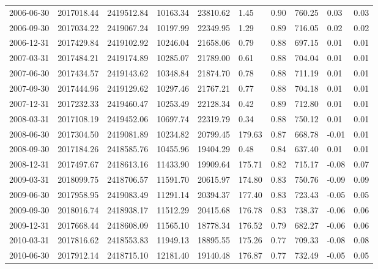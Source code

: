 \begin{landscape}
\begin{longtable}{llllllllll}
2006-06-30 & 2017018.44 & 2419512.84 & 10163.34 & 23810.62 & 1.45   & 0.90         & 760.25   & 0.03     & 0.03     \\
2006-09-30 & 2017034.22 & 2419067.24 & 10197.99 & 22349.95 & 1.29   & 0.89         & 716.05   & 0.02     & 0.02     \\
2006-12-31 & 2017429.84 & 2419102.92 & 10246.04 & 21658.06 & 0.79   & 0.88         & 697.15   & 0.01     & 0.01     \\
2007-03-31 & 2017484.21 & 2419174.89 & 10285.07 & 21789.00 & 0.61   & 0.88         & 704.04   & 0.01     & 0.01     \\
2007-06-30 & 2017434.57 & 2419143.62 & 10348.84 & 21874.70 & 0.78   & 0.88         & 711.19   & 0.01     & 0.01     \\
2007-09-30 & 2017444.96 & 2419129.62 & 10297.46 & 21767.21 & 0.77   & 0.88         & 704.18   & 0.01     & 0.01     \\
2007-12-31 & 2017232.33 & 2419460.47 & 10253.49 & 22128.34 & 0.42   & 0.89         & 712.80   & 0.01     & 0.01     \\
2008-03-31 & 2017108.19 & 2419452.06 & 10697.74 & 22319.79 & 0.34   & 0.88         & 750.12   & 0.01     & 0.01     \\
2008-06-30 & 2017304.50 & 2419081.89 & 10234.82 & 20799.45 & 179.63 & 0.87         & 668.78   & -0.01    & 0.01     \\
2008-09-30 & 2017184.26 & 2418585.76 & 10455.96 & 19404.29 & 0.48   & 0.84         & 637.40   & 0.01     & 0.01     \\
2008-12-31 & 2017497.67 & 2418613.16 & 11433.90 & 19909.64 & 175.71 & 0.82         & 715.17   & -0.08    & 0.07     \\
2009-03-31 & 2018099.75 & 2418706.57 & 11591.70 & 20615.97 & 174.80 & 0.83         & 750.76   & -0.09    & 0.09     \\
2009-06-30 & 2017958.95 & 2419083.49 & 11291.14 & 20394.37 & 177.40 & 0.83         & 723.43   & -0.05    & 0.05     \\
2009-09-30 & 2018016.74 & 2418938.17 & 11512.29 & 20415.68 & 176.78 & 0.83         & 738.37   & -0.06    & 0.06     \\
2009-12-31 & 2017668.44 & 2418608.09 & 11565.10 & 18778.34 & 176.52 & 0.79         & 682.27   & -0.06    & 0.06     \\
2010-03-31 & 2017816.62 & 2418553.83 & 11949.13 & 18895.55 & 175.26 & 0.77         & 709.33   & -0.08    & 0.08     \\
2010-06-30 & 2017912.14 & 2418715.10 & 12181.40 & 19140.48 & 176.87 & 0.77         & 732.49   & -0.05    & 0.05     \\

\end{longtable}
\end{landscape}
